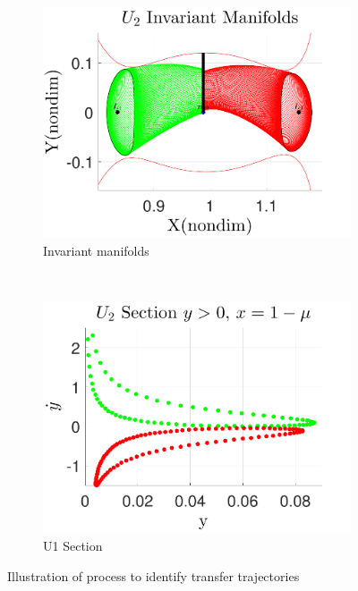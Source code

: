 \documentclass[preprint]{elsarticle}
\begin{document}
\begin{figure}
     \centering
        \begin{subfigure}[b]{0.5\textwidth}
                \includegraphics[width=\columnwidth]{U2_Manifolds}
                \caption{Invariant manifolds}
                \label{fig:manifolds}
        \end{subfigure}%
        ~
        \begin{subfigure}[b]{0.5\textwidth}
                \includegraphics[width=\columnwidth]{U2_poincare}
                \caption{U1 Section}
                \label{fig:poincare}
        \end{subfigure}
        \caption{Illustration of process to identify transfer trajectories}
	\label{fig:manifold_transfer_example}
\end{figure}
\end{document}
